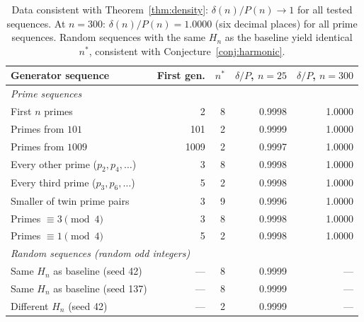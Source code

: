 \begin{table}[H]
\centering
\small
\begin{tabular}{lrrrr}
\toprule
Generator sequence & First gen. & $n^*$
  & $\delta/P$, $n=25$ & $\delta/P$, $n=300$ \\
\midrule
\multicolumn{5}{l}{\textit{Prime sequences}} \\
First $n$ primes             &    2 & 8 & 0{.}9998 & 1{.}0000 \\
Primes from $101$            &  101 & 2 & 0{.}9999 & 1{.}0000 \\
Primes from $1009$           & 1009 & 2 & 0{.}9997 & 1{.}0000 \\
Every other prime ($p_2, p_4, \ldots$) &    3 & 8 & 0{.}9998 & 1{.}0000 \\
Every third prime ($p_3, p_6, \ldots$) &  5 & 2 & 0{.}9998 & 1{.}0000 \\
Smaller of twin prime pairs  &    3 & 9 & 0{.}9996 & 1{.}0000 \\
Primes $\equiv 3 \pmod{4}$   &  3 & 8 & 0{.}9998 & 1{.}0000 \\
Primes $\equiv 1 \pmod{4}$   &  5 & 2 & 0{.}9998 & 1{.}0000 \\
\multicolumn{5}{l}{\textit{Random sequences (random odd integers)}} \\
Same $H_n$ as baseline (seed 42)  & {---} & 8 & 0{.}9999 & {---} \\
Same $H_n$ as baseline (seed 137) & {---} & 8 & 0{.}9999 & {---} \\
Different $H_n$ (seed 42)         & {---} & 2 & 0{.}9999 & {---} \\
\bottomrule
\end{tabular}
\caption{Data consistent with Theorem~\ref{thm:density}:
$\delta(n)/P(n) \to 1$ for all tested sequences.
At $n=300$: $\delta(n)/P(n) = 1{.}0000$ (six decimal places)
for all prime sequences.
Random sequences with the same $H_n$ as the baseline yield
identical $n^*$, consistent with Conjecture~\ref{conj:harmonic}.}
\label{tab:sequences}
\end{table}
